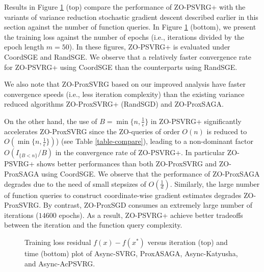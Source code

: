 \documentclass{article}
\theoremstyle{definition}
\theoremstyle{remark}
\begin{document}
Results in Figure \ref{binary-fig} (top) compare the performance of ZO-PSVRG+ with the variants of variance reduction stochastic gradient descent described earlier in this section against the number of function queries.
{\color{Brown}
In Figure \ref{binary-fig} (bottom), we present the training loss against the number of epochs (i.e., iterations divided by the
epoch length $m = 50$). In these figures, ZO-PSVRG+ is evaluated under CoordSGE and RandSGE.
{\color{Brown}
We observe that a relatively faster convergence rate for ZO-PSVRG+ using CoordSGE than the counterparts using RandSGE. 
}
}
  
{\color{Brown}
We also note that ZO-ProxSVRG based on
our improved analysis have faster
convergence speeds (i.e., less iteration complexity) than the existing variance reduced algorithms ZO-ProxSVRG+ (RandSGD) and ZO-ProxSAGA.
}

On the other hand, the use of $B = \min\{n, \frac{1}{\epsilon}\}$ in ZO-PSVRG+ significantly
accelerates ZO-ProxSVRG since the ZO-queries of order $O(n)$ is reduced to $O(\min\{n, \frac{1}{\epsilon}\})$) (see Table \ref{table-compare}), leading
to a non-dominant factor $O(I_{\{B < n\}}/B)$ in the convergence rate of ZO-PSVRG+.
{\color{Green}
In particular ZO-PSVRG+ shows better performances than both {\color{red} ZO-ProxSVRG and ZO-ProxSAGA
using CoordSGE}. }
{\color{red} We observe that the performance of ZO-ProxSAGA degrades due to the need of small stepsizes of $O(\frac{1}{d})$. Similarly, the large number of function queries to construct
coordinate-wise gradient estimates degrades ZO-ProxSVRG. By contrast, ZO-ProxSGD consumes an extremely large number of iterations ($14600$ epochs). As a result, ZO-PSVRG+ achieve better tradeoffs between the iteration and the function query complexity.}


\begin{figure}[htbp]\label{binary-fig}

%
\addtocounter{subfigure}{-4}
%
%
\end{figure}
\begin{figure}
%
%
%
\setlength{\abovecaptionskip}{2pt}
\caption{Training loss residual $f(x) - f(x^*)$ versus iteration (top) and time (bottom) plot of Async-SVRG, ProxASAGA, Async-Katyusha, and Async-AcPSVRG. }
\label{fig:algo_comp}
\end{figure}
\end{document}
